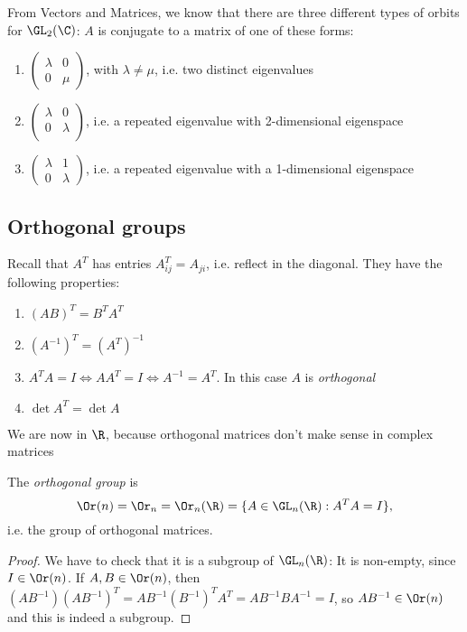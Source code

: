 \documentclass[a4paper]{article}
\begin{document}
  From Vectors and Matrices, we know that there are three different types of orbits for $\GL_2(\C)$: $A$ is conjugate to a matrix of one of these forms:
  \begin{enumerate}
    \item $
      \begin{pmatrix}
        \lambda & 0\\
        0 & \mu
      \end{pmatrix}
      $, with $\lambda \not= \mu$, i.e. two distinct eigenvalues
    \item $
      \begin{pmatrix}
        \lambda & 0\\
        0 & \lambda\\
      \end{pmatrix}$, i.e. a repeated eigenvalue with 2-dimensional eigenspace
    \item $
      \begin{pmatrix}
        \lambda & 1\\
        0 & \lambda
      \end{pmatrix}$, i.e. a repeated eigenvalue with a 1-dimensional eigenspace
  \end{enumerate}
  \subsection{Orthogonal groups}
  Recall that $A^T$ has entries $A^{T}_{ij} = A_{ji}$, i.e. reflect in the diagonal. They have the following properties:
  \begin{enumerate}
    \item $(AB)^T = B^TA^T$
    \item $(A^{-1})^T = (A^T)^{-1}$
    \item $A^{T}A = I\Leftrightarrow AA^{T} = I\Leftrightarrow A^{-1} = A^{T}$. In this case $A$ is \emph{orthogonal}
    \item $\det A^{T} = \det A$
  \end{enumerate}
  \note We are now in $\R$, because orthogonal matrices don't make sense in complex matrices

  \begin{defi}
    The \emph{orthogonal group} is 
    \[
      \Or(n) = \Or_n = \Or_n(\R) = \{A\in \GL_n(\R): A^TA = I\},
    \]
    i.e. the group of orthogonal matrices.
  \end{defi}

  \begin{proof}
    We have to check that it is a subgroup of $\GL_n(\R)$: It is non-empty, since $I\in \Or(n)$. If $A, B\in \Or(n)$, then $(AB^{-1})(AB^{-1})^T = AB^{-1}(B^{-1})^TA^{T} = AB^{-1}BA^{-1} = I$, so $AB^{-1}\in \Or(n)$ and this is indeed a subgroup.
  \end{proof}
\end{document}
